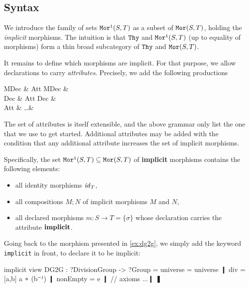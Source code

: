 
\subsection{Syntax}

We introduce the family of sets $\mathtt{Mor^i}(S,T)$ as a subset of $\mathtt{Mor}(S,T)$, holding the \textit{implicit} morphisms.
The intuition is that $\mathtt{Thy}$ and $\mathtt{Mor^i}(S,T)$ (up to equality of morphisms) form a thin broad subcategory of $\mathtt{Thy}$ and $\mathtt{Mor}(S,T)$.

It remains to define which morphisms are implicit.
For that purpose, we allow \mmt declarations to carry \textit{attributes}.
Precisely, we add the following productions
\begin{grammar}
MDec   & Att\; MDec  &  \\
Dec    & Att\; Dec   & \\
Att    &  \alt \ldots & 
\end{grammar}

The set of attributes is itself extensible, and the above grammar only list the one that we use to get started.
Additional attributes may be added with the condition that any additional attribute increases the set of implicit morphisms.

Specifically, the set $\mathtt{Mor^i}(S,T)\subseteq\mathtt{Mor}(S,T)$ of \textbf{implicit} morphisms contains the following elements:
\begin{itemize}
 \item all identity morphisms $\mathit{id}_{T}$,
 \item all compositions $M;N$ of implicit morphisms $M$ and $N$,
 \item all declared morphisms $m:S\to T=\{\sigma\}$ whose declaration carries the attribute $\operatorname{\mathbf{implicit}}$.
\end{itemize}

\begin{example}\label{ex:dg2gimplicit}
Going back to the morphism presented in \autoref{ex:dg2g}, we simply add the keyword \lstinline|implicit| in front, to declare it to be implicit:
\begin{mmtcode}
implicit view DG2G : ?DivisionGroup -> ?Group =
  universe = universe ❙
  div = [a,b] a ∘ (b⁻¹) ❙
  nonEmpty = e ❙
  // axioms ...❙
❚
\end{mmtcode}
\end{example}

